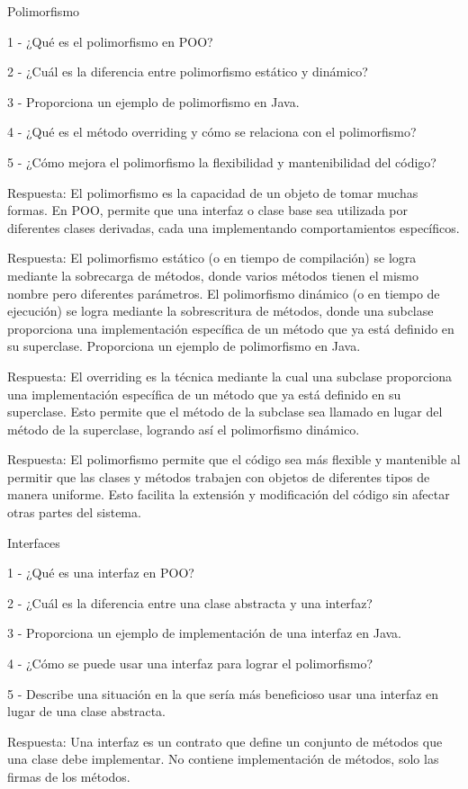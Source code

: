 Polimorfismo

1 - ¿Qué es el polimorfismo en POO?

2 - ¿Cuál es la diferencia entre polimorfismo estático y dinámico?

3 - Proporciona un ejemplo de polimorfismo en Java.

4 - ¿Qué es el método overriding y cómo se relaciona con el polimorfismo?

5 - ¿Cómo mejora el polimorfismo la flexibilidad y mantenibilidad del código?

Respuesta: El polimorfismo es la capacidad de un objeto de tomar muchas formas. En POO, permite que una interfaz o clase base sea utilizada por diferentes clases derivadas, cada una implementando comportamientos específicos.

Respuesta: El polimorfismo estático (o en tiempo de compilación) se logra mediante la sobrecarga de métodos, donde varios métodos tienen el mismo nombre pero diferentes parámetros. El polimorfismo dinámico (o en tiempo de ejecución) se logra mediante la sobrescritura de métodos, donde una subclase proporciona una implementación específica de un método que ya está definido en su superclase.
Proporciona un ejemplo de polimorfismo en Java.

Respuesta: El overriding es la técnica mediante la cual una subclase proporciona una implementación específica de un método que ya está definido en su superclase. Esto permite que el método de la subclase sea llamado en lugar del método de la superclase, logrando así el polimorfismo dinámico.

Respuesta: El polimorfismo permite que el código sea más flexible y mantenible al permitir que las clases y métodos trabajen con objetos de diferentes tipos de manera uniforme. Esto facilita la extensión y modificación del código sin afectar otras partes del sistema.

Interfaces

1 - ¿Qué es una interfaz en POO?

2 - ¿Cuál es la diferencia entre una clase abstracta y una interfaz?

3 - Proporciona un ejemplo de implementación de una interfaz en Java.

4 - ¿Cómo se puede usar una interfaz para lograr el polimorfismo?

5 - Describe una situación en la que sería más beneficioso usar una interfaz en lugar de una clase abstracta.

Respuesta: Una interfaz es un contrato que define un conjunto de métodos que una clase debe implementar. No contiene implementación de métodos, solo las firmas de los métodos.

